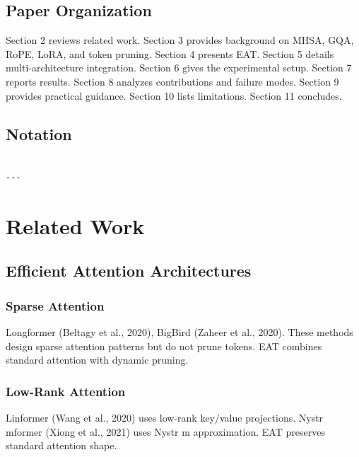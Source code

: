 \subsection{Paper Organization}

Section 2 reviews related work. Section 3 provides background on MHSA, GQA, 
RoPE, LoRA, and token pruning. Section 4 presents EAT. Section 5 details 
multi-architecture integration. Section 6 gives the experimental setup. 
Section 7 reports results. Section 8 analyzes contributions and failure 
modes. Section 9 provides practical guidance. Section 10 lists limitations. 
Section 11 concludes.



\subsection{Notation}

\begin{lstlisting}

---
\end{lstlisting}


\section{Related Work}

\subsection{Efficient Attention Architectures}

\subsubsection{Sparse Attention}

Longformer (Beltagy et al., 2020), BigBird (Zaheer et al., 2020). These 
methods design sparse attention patterns but do not prune tokens. EAT 
combines standard attention with dynamic pruning.

\subsubsection{Low-Rank Attention}

Linformer (Wang et al., 2020) uses low-rank key/value projections. 
Nystr mformer (Xiong et al., 2021) uses Nystr m approximation. EAT 
preserves standard attention shape.

